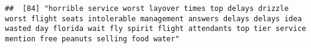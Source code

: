 \documentclass[
]{article}
\begin{document}
\begin{verbatim}
##  [84] "horrible service worst layover times top delays drizzle worst flight seats intolerable management answers delays delays idea wasted day florida wait fly spirit flight attendants top tier service mention free peanuts selling food water"                                                                                                                                                                                                                                                                                                                                                                                                                                                                                                                                                                                                                                                                                                                                                                                                                                                                                                                                                                                                                                                                                                                                                                                                                                                                                                                                                                                                                                                                                                                                                    

\end{verbatim}
\end{document}
